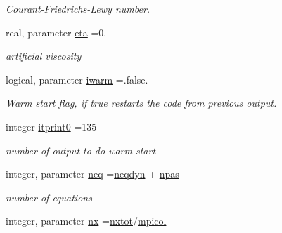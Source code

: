\begin{DoxyCompactItemize}
\begin{DoxyCompactList}\small\item\em Courant-\/\+Friedrichs-\/\+Lewy number. \end{DoxyCompactList}\item 
\hypertarget{namespaceparameters_a0f11692236dfb49ab2bb451103faf8f1}{}real, parameter \hyperlink{namespaceparameters_a0f11692236dfb49ab2bb451103faf8f1}{eta} =0.\label{namespaceparameters_a0f11692236dfb49ab2bb451103faf8f1}

\begin{DoxyCompactList}\small\item\em artificial viscosity \end{DoxyCompactList}\item 
\hypertarget{namespaceparameters_afc7a92e21b69eb6d20e4488030bd1300}{}logical, parameter \hyperlink{namespaceparameters_afc7a92e21b69eb6d20e4488030bd1300}{iwarm} =.false.\label{namespaceparameters_afc7a92e21b69eb6d20e4488030bd1300}

\begin{DoxyCompactList}\small\item\em Warm start flag, if true restarts the code from previous output. \end{DoxyCompactList}\item 
\hypertarget{namespaceparameters_af9639278be37d485bbe316a0a4389157}{}integer \hyperlink{namespaceparameters_af9639278be37d485bbe316a0a4389157}{itprint0} =135\label{namespaceparameters_af9639278be37d485bbe316a0a4389157}

\begin{DoxyCompactList}\small\item\em number of output to do warm start \end{DoxyCompactList}\item 
\hypertarget{namespaceparameters_a37fe125b9070b83bc96f133a6485b0f2}{}integer, parameter \hyperlink{namespaceparameters_a37fe125b9070b83bc96f133a6485b0f2}{neq} =\hyperlink{namespaceparameters_ad2e282b7f56de824d72b1acf9f8aa674}{neqdyn} + \hyperlink{namespaceparameters_a5cce81231f97dddc9a7abc8ad2691fcf}{npas}\label{namespaceparameters_a37fe125b9070b83bc96f133a6485b0f2}

\begin{DoxyCompactList}\small\item\em number of equations \end{DoxyCompactList}\item 
\hypertarget{namespaceparameters_a1a3b8ba995adb2f1c093cdc8b37eb5bd}{}integer, parameter \hyperlink{namespaceparameters_a1a3b8ba995adb2f1c093cdc8b37eb5bd}{nx} =\hyperlink{namespaceparameters_a40b20d533d3bf5defbb402e4ed4f26f1}{nxtot}/\hyperlink{namespaceparameters_a5cf63ae056650e314df11497f8b13e28}{mpicol}\label{namespaceparameters_a1a3b8ba995adb2f1c093cdc8b37eb5bd}


\end{DoxyCompactItemize}
